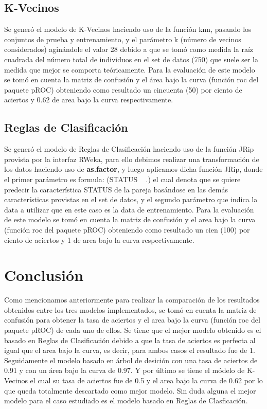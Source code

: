\documentclass[twocolumn,showpacs,%
  nofootinbib,aps,superscriptaddress,%
  eqsecnum,prd,notitlepage,showkeys,10pt]{revtex4-1}
\begin{document}
\subsection{K-Vecinos}
Se generó el modelo de K-Vecinos haciendo uso de la función knn, pasando los conjuntos de prueba y entrenamiento, y el parámetro  k (número de vecinos considerados) aginándole el valor 28 debido a que se tomó como medida la raíz cuadrada del número total de individuos en el set de datos (750) que suele ser la medida que mejor se comporta teóricamente. Para la evaluación de este modelo se tomó en cuenta la matriz de confusión y el área bajo la curva (función roc del paquete pROC) obteniendo como resultado un cincuenta (50) por ciento de aciertos y 0.62 de area bajo la curva respectivamente. 

\subsection{Reglas de Clasificación}
Se generó el modelo de Reglas de Clasificación haciendo uso de la función JRip provista por la interfaz RWeka, para ello debimos realizar una transformación de los datos haciendo uso de \textbf{as.factor}, y luego aplicamos dicha función JRip, donde el primer parámetro es formula: (STATUS ~ .)  el cual denota que se quiere predecir la característica STATUS de la pareja basándose en las demás características provistas en el set de datos, y el segundo parámetro que indica la data a utilizar que en este caso es la data de entrenamiento.  Para la evaluación de este modelo se tomó en cuenta la matriz de confusión y el area bajo la curva (función roc del paquete pROC) obteniendo como resultado un cien (100) por ciento de aciertos y 1 de area bajo la curva respectivamente. 

\section{Conclusión}
Como mencionamos anteriormente para realizar la comparación de los resultados obtenidos entre los tres modelos implementados, se tomó en cuenta la matriz de confusión para obtener la tasa de aciertos y el area bajo la curva (función roc del paquete pROC) de cada uno de ellos. Se tiene que el mejor modelo obtenido es el basado en Reglas de Clasificación debido a que la tasa de aciertos es perfecta al igual que el area bajo la curva, es decir, para ambos casos el resultado fue de 1. Seguidamente el modelo basado en árbol de desición con una tasa de aciertos de 0.91 y con un área bajo la curva de 0.97. Y por último se tiene el módelo de K-Vecinos el cual su tasa de aciertos fue de 0.5 y el area bajo la curva de 0.62 por lo que queda totalmente descartado como mejor modelo. Sin duda alguna el mejor modelo para el caso estudiado es el modelo basado en Reglas de Clasficación.
\end{document}
